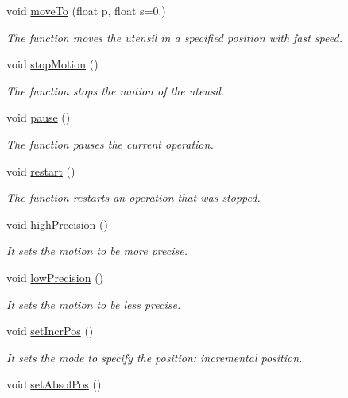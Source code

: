 \begin{DoxyCompactItemize}
void \hyperlink{class_milling_machine_aafe8cc6c2658daa7b801f1f1c2c37098}{move\+To} (float p, float s=0.)
\begin{DoxyCompactList}\small\item\em The function moves the utensil in a specified position with fast speed. \end{DoxyCompactList}\item 
void \hyperlink{class_milling_machine_a3b530b356897ef7b7d25f55ce8965775}{stop\+Motion} ()
\begin{DoxyCompactList}\small\item\em The function stops the motion of the utensil. \end{DoxyCompactList}\item 
void \hyperlink{class_milling_machine_a8600c252d19b2b1318400c3e8567591b}{pause} ()
\begin{DoxyCompactList}\small\item\em The function pauses the current operation. \end{DoxyCompactList}\item 
void \hyperlink{class_milling_machine_a9bd0cff7083490bf93c1c04d728e7050}{restart} ()
\begin{DoxyCompactList}\small\item\em The function restarts an operation that was stopped. \end{DoxyCompactList}\item 
void \hyperlink{class_milling_machine_a3236520b26c7ab2ebad6a89edfc67d8c}{high\+Precision} ()
\begin{DoxyCompactList}\small\item\em It sets the motion to be more precise. \end{DoxyCompactList}\item 
void \hyperlink{class_milling_machine_a1596fbec50d30b119393c9dec4afb164}{low\+Precision} ()
\begin{DoxyCompactList}\small\item\em It sets the motion to be less precise. \end{DoxyCompactList}\item 
void \hyperlink{class_milling_machine_a07f35ca38be74aa50663a22caeb6cd3e}{set\+Incr\+Pos} ()
\begin{DoxyCompactList}\small\item\em It sets the mode to specify the position\+: incremental position. \end{DoxyCompactList}\item 
void \hyperlink{class_milling_machine_a0e370f1cd0f4a3fba8dce457d8c539f0}{set\+Absol\+Pos} ()

\end{DoxyCompactItemize}
